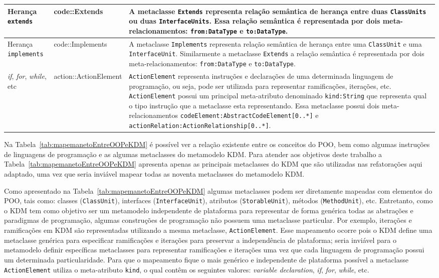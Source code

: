 \begin{longtable}[c]{| m{1.9cm} | m{3.57cm}| m{9.3cm} |}
\hline
Herança \texttt{extends} & code::Extends & A metaclasse \texttt{Extends} representa relação semântica de herança entre duas \texttt{ClassUnits} ou duas \texttt{InterfaceUnits}. Essa relação semântica é representada por dois meta-relacionamentos: \texttt{from:DataType} e \texttt{to:DataType}.\\ 
\hline
Herança \texttt{implements} & code::Implements & A metaclasse \texttt{Implements} representa relação semântica de herança entre uma \texttt{ClassUnit} e uma \texttt{InterfaceUnit}. Similarmente a metaclasse \texttt{Extends} a relação semântica é representada por dois meta-relacionamentos: \texttt{from:DataType} e \texttt{to:DataType}.\\ 
\hline
\textit{if}, \textit{for}, \textit{while}, etc & action::ActionElement & \texttt{ActionElement} representa instruções e declarações de uma determinada linguagem de programação, ou seja, pode ser utilizada para representar ramificações, iterações, etc. \texttt{ActionElement} possui um principal meta-atributo denominado \texttt{kind:String} que representa qual o tipo instrução que a metaclasse esta representando. Essa metaclasse possui dois meta-relacionamentos \texttt{codeElement:AbstractCodeElement[0..*]} e \texttt{actionRelation:ActionRelationship[0..*]}.\\ 
\hline
 \end{longtable}


Na Tabela~\ref{tab:mapemanetoEntreOOPeKDM} é possível ver a relação existente entre os conceitos do POO, bem como algumas instruções de linguagens de programação e as algumas metaclasses do metamodelo KDM. Para atender aos objetivos deste trabalho a Tabela~\ref{tab:mapemanetoEntreOOPeKDM} apresenta apenas as principais metaclasses do KDM que são utilizadas nas refatorações aqui adaptado, uma vez que seria inviável mapear todas as noventa metaclasses do metamodelo KDM.

Como apresentado na Tabela~\ref{tab:mapemanetoEntreOOPeKDM} algumas metaclasses podem ser diretamente mapeadas com elementos do POO, tais como: classes (\texttt{ClassUnit}), interfaces (\texttt{InterfaceUnit}), atributos (\texttt{StorableUnit}), métodos (\texttt{MethodUnit}), etc. Entretanto, como o KDM tem como objetivo ser um metamodelo independente de plataforma para representar de forma genérica todas as abstrações e paradigmas de programação, algumas construções de programação não possuem uma metaclasse particular. Por exemplo, iterações e ramificações em KDM são representadas utilizando a mesma metaclasse, \texttt{ActionElement}. Esse mapeamento ocorre pois o KDM define uma metaclasse genérica para especificar ramificações e iterações para preservar a independência de plataforma; seria inviável para o metamodelo definir específicas metaclasses para representar ramificações e iterações uma vez que cada linguagem de programação possui um determinada particularidade. Para que o mapeamento fique o mais genérico e independente de plataforma possível a metaclasse \texttt{ActionElement} utiliza o meta-atributo \texttt{kind}, o qual contêm os seguintes valores: \textit{variable declaration}, \textit{if}, \textit{for}, \textit{while}, etc.

